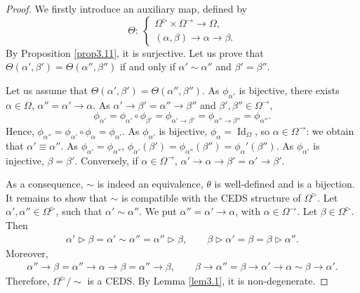 \documentclass[pdftex]{sigma}
\numberwithin{equation}{section}
\begin{document}
\begin{proof} We firstly introduce an auxiliary map, defined by
\[\Theta\colon \ \begin{cases}
\Omega^\triangleright \times \Omega^\rightarrow \longrightarrow \Omega,\\
(\alpha,\beta) \longrightarrow \alpha \rightarrow \beta.
\end{cases}\]
By Proposition \ref{prop3.11}, it is surjective. Let us prove that $\Theta(\alpha',\beta')=\Theta(\alpha'',\beta'')$ if and only if $\alpha'\sim \alpha''$ and $\beta'=\beta''$.

Let us assume that $\Theta(\alpha',\beta')=\Theta(\alpha'',\beta'')$. As $\phi_{\alpha'}$ is bijective, there exists $\alpha \in \Omega$, $\alpha''=\alpha'\rightarrow \alpha$.
As $\alpha'\rightarrow \beta'=\alpha''\rightarrow \beta''$ and $\beta',\beta''\in \Omega^\rightarrow$,
\[\phi_{\alpha'}=\phi_{\alpha'}\circ \phi_{\beta'}=\phi_{\alpha'\rightarrow \beta'}=\phi_{\alpha''\rightarrow \beta''}=\phi_{\alpha''}.\]
Hence,
$\phi_{\alpha''}=\phi_{\alpha'}\circ \phi_{\alpha}=\phi_{\alpha'}$.
As $\phi_{\alpha'}$ is bijective, $\phi_\alpha=\operatorname{Id}_\Omega$, so $\alpha \in \Omega^\rightarrow$: we obtain that $\alpha'\equiv \alpha''$. As $\phi_{\alpha'}=\phi_{\alpha''}$, $\phi_{\alpha'}(\beta')=\phi_{\alpha''}(\beta'')=\phi_\alpha'(\beta'')$.
As $\phi_{\alpha'}$ is injective, $\beta=\beta'$. Conversely, if $\alpha \in \Omega^\rightarrow$, $\alpha'\rightarrow \alpha \rightarrow\beta'=\alpha'\rightarrow \beta'$.

As a consequence, $\sim$ is indeed an equivalence, $\theta$ is well-defined and is a bijection. It remains to show that $\sim$ is compatible with the CEDS structure of $\Omega^\triangleright$.
Let $\alpha',\alpha''\in \Omega^\triangleright$, such that $\alpha' \sim \alpha''$. We put $\alpha''=\alpha'\rightarrow \alpha$, with $\alpha \in \Omega^\rightarrow$. Let $\beta \in \Omega^\triangleright$. Then
\begin{align*}
\alpha'\triangleright \beta=\alpha'\sim \alpha''=\alpha''\triangleright \beta,\qquad\beta \triangleright \alpha'=\beta=\beta \triangleright \alpha''.
\end{align*}
Moreover,
\begin{align*}
\alpha''\rightarrow \beta=\alpha''\rightarrow \alpha \rightarrow \beta=\alpha''\rightarrow \beta,\qquad\beta \rightarrow \alpha''=\beta \rightarrow \alpha'\rightarrow \alpha\sim \beta \rightarrow \alpha'.
\end{align*}
Therefore, $\Omega^\triangleright/{\sim}$ is a CEDS. By Lemma \ref{lem3.1}, it is non-degenerate.


\end{proof}
\end{document}
